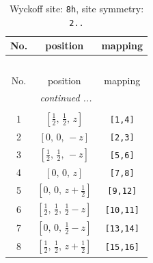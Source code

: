 \documentclass[fleqn,8pt]{jsarticle}
\begin{document}
\begin{longtable}{ccc}
\caption{Wyckoff site: {\tt 8h}, site symmetry: {\tt 2..}}
 \\
 \hline \hline
No. & position & mapping \\ \hline \endfirsthead

\multicolumn{2}{l}{\tablename\ \thetable{}} \\
 \hline \hline
No. & position & mapping \\ \hline \endhead

 \hline \hline
\multicolumn{2}{r}{\footnotesize\it continued ...} \\ \endfoot

 \hline \hline
\multicolumn{2}{r}{} \\ \endlastfoot

1 & $\left[ \frac{1}{2},\, \frac{1}{2},\, z \right]$ & {\tt [1,4]} \\ \hline
2 & $\left[ 0,\, 0,\, - z \right]$ & {\tt [2,3]} \\ \hline
3 & $\left[ \frac{1}{2},\, \frac{1}{2},\, - z \right]$ & {\tt [5,6]} \\ \hline
4 & $\left[ 0,\, 0,\, z \right]$ & {\tt [7,8]} \\ \hline
5 & $\left[ 0,\, 0,\, z + \frac{1}{2} \right]$ & {\tt [9,12]} \\ \hline
6 & $\left[ \frac{1}{2},\, \frac{1}{2},\, \frac{1}{2} - z \right]$ & {\tt [10,11]} \\ \hline
7 & $\left[ 0,\, 0,\, \frac{1}{2} - z \right]$ & {\tt [13,14]} \\ \hline
8 & $\left[ \frac{1}{2},\, \frac{1}{2},\, z + \frac{1}{2} \right]$ & {\tt [15,16]} \\
\end{longtable}
\renewcommand{\arraystretch}{1.2}
\end{document}
